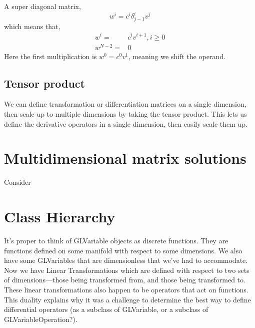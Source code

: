 \documentclass[11pt]{article}
\begin{document}
A super diagonal matrix,
\begin{equation}
w^i = c^i \delta^i_{j-1} v^j
\end{equation}
which means that,
\begin{align}
w^i = & c^i v^{i+1}, i \geqslant 0\\
w^{N-2} =& 0
\end{align}
Here the first multiplication is $w^0 = c^0 v^1$, meaning we shift the operand.

\subsection{Tensor product}

We can define transformation or differentiation matrices on a single dimension, then scale up to multiple dimensions by taking the tensor product. This lets us define the derivative operators in a single dimension, then easily scale them up.

%
%

\section{Multidimensional matrix solutions}

Consider 


\section{Class Hierarchy}

It's proper to think of GLVariable objects as discrete functions. They are functions defined on some manifold with respect to some dimensions. We also have some GLVariables that are dimensionless that we've had to accommodate. Now we have Linear Transformations which are defined with respect to two sets of dimensions---those being transformed from, and those being transformed to. These linear transformations also happen to be operators that act on functions. This duality explains why it was a challenge to determine the best way to define differential operators (as a subclass of GLVariable, or a subclass of GLVariableOperation?).
\end{document}
